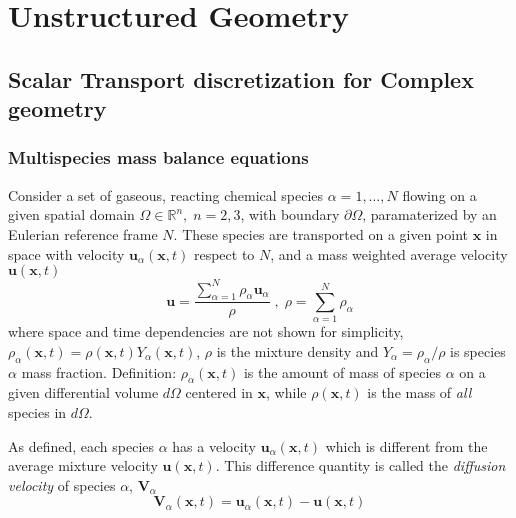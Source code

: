 






\chapter{Unstructured Geometry}


\section{Scalar Transport discretization for Complex geometry}


\subsection{Multispecies mass balance equations}

Consider a set of gaseous, reacting  chemical species $\alpha=1,\dots,N$ flowing on a given spatial domain $\Omega \in \mathbb{R}^n, \; n=2,3$, with boundary $\partial \Omega$, paramaterized by an Eulerian reference frame $N$. These species are transported on a given point $\mathbf{x}$ in space with velocity $\mathbf{u}_\alpha(\mathbf{x},t)$ respect to $N$, and a mass weighted average velocity $\mathbf{u}(\mathbf{x},t)$
%
\begin{equation}
  \mathbf{u} = \frac{ \sum\limits_{\alpha=1}^{N} {\rho_\alpha \mathbf{u}_\alpha}}{\rho} \; , \; \rho =  \sum\limits_{\alpha=1}^{N} {\rho_\alpha} \label{eq:veldens}
\end{equation}
%
where space and time dependencies are not shown for simplicity, $\rho_\alpha(\mathbf{x},t) = \rho(\mathbf{x},t) Y_\alpha (\mathbf{x},t)$, $\rho$ is the mixture density and $Y_\alpha = \rho_\alpha / \rho$ is species $\alpha$ mass fraction. Definition: $\rho_\alpha(\mathbf{x},t)$ is the amount of mass of species $\alpha$ on a given differential volume $d\Omega$ centered in $\mathbf{x}$, while  $\rho(\mathbf{x},t)$ is the mass of \textit{all} species in $d\Omega$.

As defined, each species $\alpha$ has a velocity $\mathbf{u}_\alpha(\mathbf{x},t)$ which is different from the average mixture velocity $\mathbf{u}(\mathbf{x},t)$. This difference quantity is called the \textit{diffusion velocity} of species $\alpha$, $\mathbf{V}_\alpha$
%
\begin{equation}
   \mathbf{V}_\alpha(\mathbf{x},t) = \mathbf{u}_\alpha(\mathbf{x},t) - \mathbf{u}(\mathbf{x},t) \label{eq:vdiff}
\end{equation}
%

